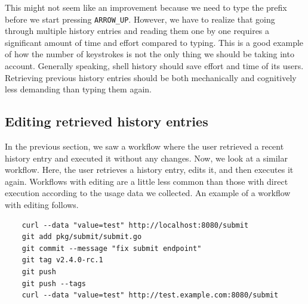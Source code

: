 This might not seem like an improvement because we need to type the prefix before we start pressing \verb|ARROW_UP|. However, we have to realize that going through multiple history entries and reading them one by one requires a significant amount of time and effort compared to typing. 
This is a good example of how the number of keystrokes is not the only thing we should be taking into account. Generally speaking, shell history should save effort and time of its users. Retrieving previous history entries should be both mechanically and cognitively less demanding than typing them again.\cite{greenberg1993computer}






\subsection{Editing retrieved history entries}

In the previous section, we saw a workflow where the user retrieved a recent history entry and executed it without any changes. Now, we look at a similar workflow. Here, the user retrieves a history entry, edits it, and then executes it again. Workflows with editing are a little less common than those with direct execution according to the usage data we collected. An example of a workflow with editing follows.

\begin{verbatim}
    curl --data "value=test" http://localhost:8080/submit
    git add pkg/submit/submit.go
    git commit --message "fix submit endpoint"
    git tag v2.4.0-rc.1
    git push
    git push --tags
    curl --data "value=test" http://test.example.com:8080/submit
\end{verbatim}


